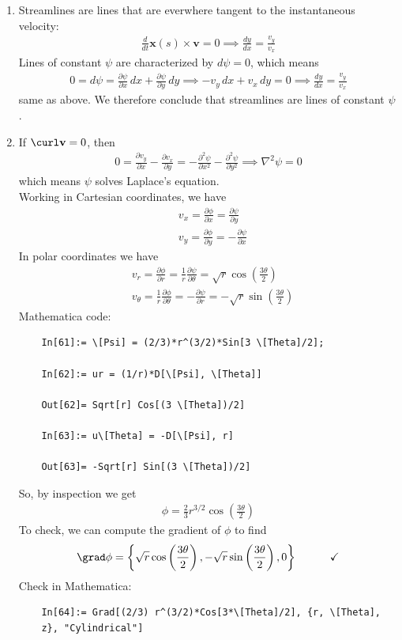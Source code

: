 \documentclass{article}
\theoremstyle{definition}
\newcommand{\p}{\partial}
\newcommand{\f}[2]{\frac{#1}{#2}}
\newcommand{\lp}{\left(}
\newcommand{\rp}{\right)}
\newcommand{\lc}{\left\{}
\newcommand{\rc}{\right\}}
\begin{document}
\begin{enumerate}[label=(\alph*)]
	\item Streamlines are lines that are everwhere tangent to the instantaneous velocity:
	\begin{align*}
	\f{d}{dt}\mathbf{x}(s) \times \mathbf{v} =0 \implies \f{dy}{dx} = \f{v_y}{v_x}
	\end{align*}
	Lines of constant $\psi$ are characterized by $d\psi = 0$, which means 
	\begin{align*}
	0 = d\psi = \f{\p \psi}{\p x} \, dx + \f{\p \psi}{\p y} \, dy \implies -v_y \,dx + v_x\,dy = 0 \implies \f{dy}{dx} = \f{v_y}{v_x}
	\end{align*}
	same as above. We therefore conclude that streamlines are lines of constant $\psi$. 
	
	
	\item If $\curl \mathbf{v} = 0$, then 
	\begin{align*}
	0 = \f{\p v_y }{\p x} - \f{\p v_x}{\p y} = -\f{\p^2 \psi }{\p x^2} - \f{\p^2 \psi }{\p y^2} \implies  \nabla^2 \psi = 0
	\end{align*}
	which means $\psi$ solves Laplace's equation. \\
	
	
	
	
	
	Working in Cartesian coordinates, we have
	\begin{align*}
	&v_x = \f{\p \phi}{\p x} = \f{\p \psi}{\p y} \\
	&v_y = \f{\p \phi}{\p y} = -\f{\p \psi}{\p x}
	\end{align*}
	In polar coordinates we have
	\begin{align*}
	&v_r = \f{\p \phi}{\p r} = \f{1}{r}\f{\p \psi}{\p \theta} = \sqrt{r} \cos\lp \f{3\theta}{2} \rp\\
	&v_\theta = \f{1}{r}\f{\p \phi}{\p \theta} = -\f{\p \psi}{\p r} = -\sqrt{r}\sin\lp \f{3\theta}{2} \rp
	\end{align*}
	Mathematica code:
	\begin{lstlisting}
	In[61]:= \[Psi] = (2/3)*r^(3/2)*Sin[3 \[Theta]/2];
	
	In[62]:= ur = (1/r)*D[\[Psi], \[Theta]]
	
	Out[62]= Sqrt[r] Cos[(3 \[Theta])/2]
	
	In[63]:= u\[Theta] = -D[\[Psi], r]
	
	Out[63]= -Sqrt[r] Sin[(3 \[Theta])/2]
	\end{lstlisting}
	So, by inspection we get
	\begin{align*}
	\boxed{\phi = \f{2}{3}r^{3/2}\cos\lp \f{3\theta}{2} \rp}
	\end{align*}
	To check, we can compute the gradient of $\phi$ to find 
	\begin{align*}
	\grad \phi = \lc \sqrt{r} \cos\lp \f{3\theta}{2} \rp, -\sqrt{r}\sin\lp \f{3\theta}{2} \rp ,0 \rc \quad\quad \quad \checkmark
	\end{align*}
	Check in Mathematica:
	\begin{lstlisting}
	In[64]:= Grad[(2/3) r^(3/2)*Cos[3*\[Theta]/2], {r, \[Theta], 
	z}, "Cylindrical"]
	

\end{lstlisting}
\end{enumerate}
\end{document}
